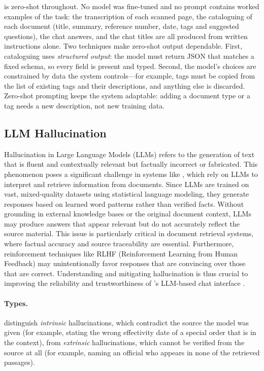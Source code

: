 \cs{} is zero-shot throughout. No model was fine-tuned and no prompt contains worked examples of the task: the transcription of each scanned page, the cataloguing of each document (title, summary, reference number, date, tags and suggested questions), the chat answers, and the chat titles are all produced from written instructions alone. Two techniques make zero-shot output dependable. First, cataloguing uses \emph{structured output}: the model must return JSON that matches a fixed schema, so every field is present and typed. Second, the model's choices are constrained by data the system controls---for example, tags must be copied from the list of existing tags and their descriptions, and anything else is discarded. Zero-shot prompting keeps the system adaptable: adding a document type or a tag needs a new description, not new training data.

\subsection{LLM Hallucination}\label{sec:hallucination}

Hallucination in Large Language Models (LLMs) refers to the generation of text that is fluent and contextually relevant but factually incorrect or fabricated. This phenomenon poses a significant challenge in systems like \cs{}, which rely on LLMs to interpret and retrieve information from documents. Since LLMs are trained on vast, mixed-quality datasets using statistical language modeling, they generate responses based on learned word patterns rather than verified facts. Without grounding in external knowledge bases or the original document context, LLMs may produce answers that appear relevant but do not accurately reflect the source material. This issue is particularly critical in document retrieval systems, where factual accuracy and source traceability are essential. Furthermore, reinforcement techniques like RLHF (Reinforcement Learning from Human Feedback) may unintentionally favor responses that are convincing over those that are correct. Understanding and mitigating hallucination is thus crucial to improving the reliability and trustworthiness of \cs{}'s LLM-based chat interface \citep{ji2023hallucination}.

\paragraph{Types.} \citet{ji2023hallucination} distinguish \emph{intrinsic} hallucinations, which contradict the source the model was given (for example, stating the wrong effectivity date of a special order that is in the context), from \emph{extrinsic} hallucinations, which cannot be verified from the source at all (for example, naming an official who appears in none of the retrieved passages).

